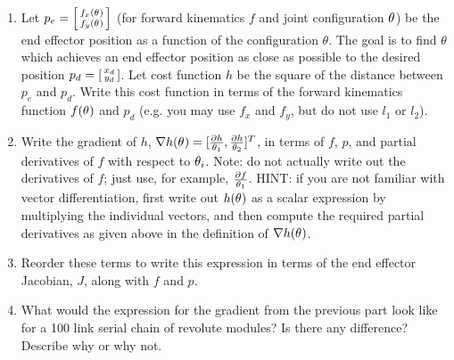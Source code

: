 \documentclass{16384_doc}
\begin{document}
\begin{questions}
    \begin{enumerate} [label=\alph*.]
        \item \text{[10 points]} Let $p_e = \smcolvec{f_x(\th)\\f_y(\th)}$ (for forward kinematics $f$
        and joint configuration $\th$)  be the end effector position as a function of the configuration $\theta$. The goal is to find $\theta$ which achieves an end effector position as close as possible to the desired
        position $p_d=\smcolvec{x_d\\y_d}$. Let cost function $h$ be the square of
        the distance between $p_e$ and $p_d$. Write this cost function in terms
        of the forward kinematics function $f(\th)$ and $p_d$ (e.g. you may use $f_x$
        and $f_y$, but do not use $l_1$ or $l_2$).
        
        \begin{tcolorbox}[height=3cm]
        \end{tcolorbox}

        \item \text{[10 points]} Write the gradient of $h$, $\nabla h(\th) = [ \partialfrac{h}{\th[1]}, \partialfrac{h}{\th[2]} ]^{T}$,
        in terms of $f$, $p$, and partial derivatives of $f$ with respect to
        $\th[i]$.  Note: do not actually write out the derivatives of $f$; just
        use, for example, $\partialfrac{f}{\th[1]}$. HINT: if you
        are not familiar with vector differentiation, first write out $h(\th)$
        as a scalar expression by multiplying the individual vectors, and
        then compute the required partial derivatives as given above in the
        definition of $\nabla h(\th)$.

        \begin{tcolorbox}[height=3cm]
        \end{tcolorbox}

        \item \text{[10 points]} Reorder these terms to write this expression in terms of the
        end effector Jacobian, $J$, along with $f$ and $p$.
        
        \begin{tcolorbox}[height=3cm]
        \end{tcolorbox}

        \item \text{[10 points]} What would the expression for the gradient from the previous part
        look like for a 100 link serial chain of revolute modules? Is there any
        difference?  Describe why or why not.
        
        \begin{tcolorbox}[height=3cm]
        \end{tcolorbox}

    \end{enumerate}
    
    \newpage
\end{questions}
\end{document}
